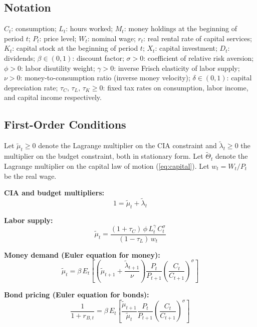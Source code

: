 \documentclass[11pt, a4paper]{article}
\begin{document}
\subsection*{Notation}

$C_t$: consumption; $L_t$: hours worked; $M_t$: money holdings at the beginning
of period $t$; $P_t$: price level; $W_t$: nominal wage; $r_t$: real rental rate
of capital services; $K_t$: capital stock at the beginning of period $t$;
$X_t$: capital investment; $D_t$: dividends; $\beta \in (0,1)$: discount
factor; $\sigma > 0$: coefficient of relative risk aversion; $\phi > 0$: labor
disutility weight; $\gamma > 0$: inverse Frisch elasticity of labor supply;
$\nu > 0$: money-to-consumption ratio (inverse money velocity); $\delta \in (0,1)$: capital depreciation rate;
$\tau_C,\,\tau_L,\,\tau_K \geq 0$: fixed tax rates on consumption, labor
income, and capital income respectively.

\subsection*{First-Order Conditions}

Let $\tilde{\mu}_t \geq 0$ denote the Lagrange multiplier on the CIA constraint
and $\tilde{\lambda}_t \geq 0$ the multiplier on the budget constraint, both in
stationary form. Let $\tilde{\Theta}_t$ denote the Lagrange multiplier on the
capital law of motion (\ref{eq:capital}). Let $w_t = W_t/P_t$ be the real wage.

\textbf{CIA and budget multipliers:}
\begin{equation}
    1 = \tilde{\mu}_t + \tilde{\lambda}_t
    \label{eq:mult_split}
\end{equation}

\textbf{Labor supply:}
\begin{equation}
    \tilde{\mu}_t
    = \frac{(1+\tau_C)\,\phi\,L_t^{\gamma}\,C_t^{\sigma}}{(1-\tau_L)\,w_t}
    \label{eq:labor_supply}
\end{equation}

\textbf{Money demand (Euler equation for money):}
\begin{equation}
    \tilde{\mu}_t
    = \beta\,E_t\!\left[
        \left(\tilde{\mu}_{t+1} + \frac{\tilde{\lambda}_{t+1}}{\nu}\right)
        \frac{P_t}{P_{t+1}}
        \left(\frac{C_t}{C_{t+1}}\right)^{\!\sigma}
    \right]
    \label{eq:money_euler}
\end{equation}

\textbf{Bond pricing (Euler equation for bonds):}
\begin{equation}
    \frac{1}{1+r_{B,t}}
    = \beta\,E_t\!\left[
        \frac{\tilde{\mu}_{t+1}}{\tilde{\mu}_t}
        \frac{P_t}{P_{t+1}}
        \left(\frac{C_t}{C_{t+1}}\right)^{\!\sigma}
    \right]
    \label{eq:bond_euler}
\end{equation}
\end{document}
